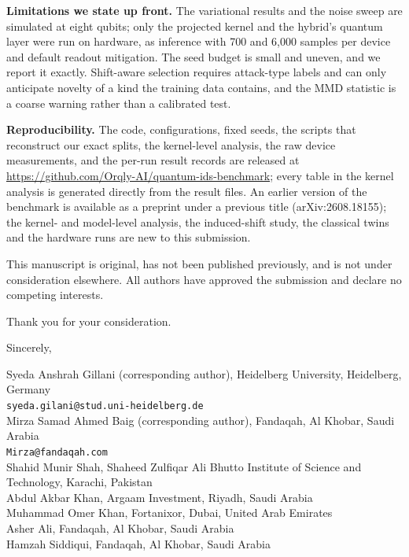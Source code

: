 \documentclass[11pt,a4paper]{article}
\begin{document}
\textbf{Limitations we state up front.} The variational results and the noise sweep are simulated at
eight qubits; only the projected kernel and the hybrid's quantum layer were run on hardware, as
inference with 700 and 6{,}000 samples per device and default readout mitigation. The seed budget is
small and uneven, and we report it exactly. Shift-aware selection requires attack-type labels and can
only anticipate novelty of a kind the training data contains, and the MMD statistic is a coarse
warning rather than a calibrated test.

\textbf{Reproducibility.} The code, configurations, fixed seeds, the scripts that reconstruct our exact
splits, the kernel-level analysis, the raw device measurements, and the per-run result records are released at
\url{https://github.com/Orqly-AI/quantum-ids-benchmark}; every table in the kernel analysis is
generated directly from the result files. An earlier version of the benchmark is available as a preprint under a previous title (arXiv:2608.18155);
the kernel- and model-level analysis, the induced-shift study, the classical twins and the hardware runs
are new to this submission.

This manuscript is original, has not been published previously, and is not under consideration
elsewhere. All authors have approved the submission and declare no competing interests.

Thank you for your consideration.

\bigskip
Sincerely,

\smallskip
Syeda Anshrah Gillani (corresponding author), Heidelberg University, Heidelberg, Germany\\
\texttt{syeda.gilani@stud.uni-heidelberg.de}\\[2pt]
Mirza Samad Ahmed Baig (corresponding author), Fandaqah, Al Khobar, Saudi Arabia\\
\texttt{Mirza@fandaqah.com}\\[2pt]
Shahid Munir Shah, Shaheed Zulfiqar Ali Bhutto Institute of Science and Technology, Karachi, Pakistan\\[2pt]
Abdul Akbar Khan, Argaam Investment, Riyadh, Saudi Arabia\\[2pt]
Muhammad Omer Khan, Fortanixor, Dubai, United Arab Emirates\\[2pt]
Asher Ali, Fandaqah, Al Khobar, Saudi Arabia\\[2pt]
Hamzah Siddiqui, Fandaqah, Al Khobar, Saudi Arabia
\end{document}
